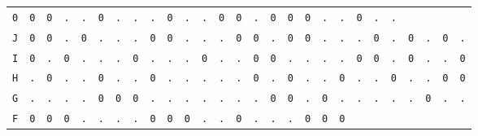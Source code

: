 \begin{figure}[H]
\begin{center}
{\begin{tabular}{c|cccccccccccccccccccccccccc}
        \texttt{0} & \texttt{0} & \texttt{0} & \texttt{.} &
        \texttt{.} & \texttt{0} & \texttt{.} & \texttt{.} &
        \texttt{.} & \texttt{0} & \texttt{.} & \texttt{.} &
        \texttt{0} & \texttt{0} & \texttt{.} & \texttt{0} &
        \texttt{0} & \texttt{0} & \texttt{.} & \texttt{.} &
        \texttt{0} & \texttt{.} & \texttt{.}                             \\
        \texttt{J} & \texttt{0} & \texttt{0} & \texttt{.} &
        \texttt{0} & \texttt{.} & \texttt{.} & \texttt{.} &
        \texttt{0} & \texttt{0} & \texttt{.} & \texttt{.} &
        \texttt{.} & \texttt{0} & \texttt{0} & \texttt{.} &
        \texttt{0} & \texttt{0} & \texttt{.} & \texttt{.} &
        \texttt{.} & \texttt{0} & \texttt{.} & \texttt{0} &
        \texttt{.} & \texttt{0} & \texttt{.}                             \\
        \texttt{I} & \texttt{0} & \texttt{.} & \texttt{0} &
        \texttt{.} & \texttt{.} & \texttt{.} & \texttt{0} &
        \texttt{.} & \texttt{.} & \texttt{.} & \texttt{0} &
        \texttt{.} & \texttt{.} & \texttt{0} & \texttt{0} &
        \texttt{.} & \texttt{.} & \texttt{.} & \texttt{.} &
        \texttt{0} & \texttt{0} & \texttt{.} & \texttt{0} &
        \texttt{.} & \texttt{.} & \texttt{0}                             \\
        \texttt{H} & \texttt{.} & \texttt{0} & \texttt{.} &
        \texttt{.} & \texttt{0} & \texttt{.} & \texttt{.} &
        \texttt{0} & \texttt{.} & \texttt{.} & \texttt{.} &
        \texttt{.} & \texttt{.} & \texttt{0} & \texttt{.} &
        \texttt{0} & \texttt{.} & \texttt{.} & \texttt{0} &
        \texttt{.} & \texttt{.} & \texttt{0} & \texttt{.} &
        \texttt{.} & \texttt{0} & \texttt{0}                             \\
        \texttt{G} & \texttt{.} & \texttt{.} & \texttt{.} &
        \texttt{.} & \texttt{0} & \texttt{0} & \texttt{0} &
        \texttt{.} & \texttt{.} & \texttt{.} & \texttt{.} &
        \texttt{.} & \texttt{.} & \texttt{.} & \texttt{0} &
        \texttt{0} & \texttt{.} & \texttt{0} & \texttt{.} &
        \texttt{.} & \texttt{.} & \texttt{.} & \texttt{.} &
        \texttt{0} & \texttt{.} & \texttt{.}                             \\
        \texttt{F} & \texttt{0} & \texttt{0} & \texttt{0} &
        \texttt{.} & \texttt{.} & \texttt{.} & \texttt{.} &
        \texttt{0} & \texttt{0} & \texttt{0} & \texttt{.} &
        \texttt{.} & \texttt{0} & \texttt{.} & \texttt{.} &
        \texttt{.} & \texttt{0} & \texttt{0} & \texttt{0} &

\end{tabular}}
\end{center}
\end{figure}
